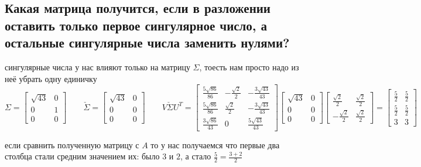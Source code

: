 \documentclass{article}
\renewcommand{\f}{\frac}
\begin{document}
  \subsection{Какая матрица получится, если в разложении оставить только первое сингулярное число, а остальные сингулярные числа заменить нулями?}
  сингулярные числа у нас влияют только на матрицу $\Sigma$, тоесть нам просто надо из неё убрать одну единичку
  $$ \Sigma = \left[\begin{matrix}\sqrt{43} & 0\\0 & 1\\0 & 0\end{matrix}\right] \qquad \check{\Sigma} = \left[\begin{matrix}\sqrt{43} & 0\\0 & 0\\0 & 0\end{matrix}\right] \qquad
  V \check{\Sigma} U^T = \left[\begin{matrix}\frac{5 \sqrt{86}}{86} & - \frac{\sqrt{2}}{2} & - \frac{3 \sqrt{43}}{43}\\\frac{5 \sqrt{86}}{86} & \frac{\sqrt{2}}{2} & - \frac{3 \sqrt{43}}{43}\\\frac{3 \sqrt{86}}{43} & 0 & \frac{5 \sqrt{43}}{43}\end{matrix}\right] \left[\begin{matrix}\sqrt{43} & 0\\0 & 0\\0 & 0\end{matrix}\right] \left[\begin{matrix}\frac{\sqrt{2}}{2} & \frac{\sqrt{2}}{2}\\- \frac{\sqrt{2}}{2} & \frac{\sqrt{2}}{2}\end{matrix}\right] = \left[\begin{matrix}\frac{5}{2} & \frac{5}{2}\\\frac{5}{2} & \frac{5}{2}\\3 & 3\end{matrix}\right] $$

  \noindent
  если сравнить полученную матрицу с $A$ то у нас получаемся что первые два столбца стали средним значением их:
  было $3$ и $2$, а стало $\f{5}{2} = \f{3+2}{2}$
\end{document}
